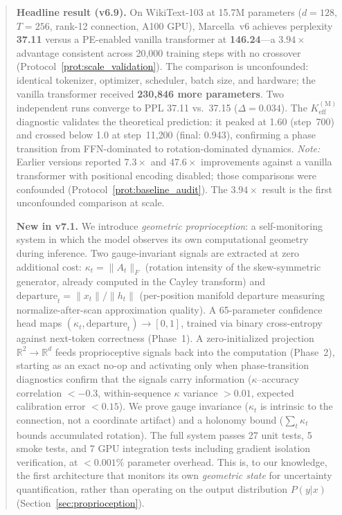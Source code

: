 \documentclass[11pt,a4paper]{article}
\theoremstyle{definition}
\theoremstyle{remark}
\begin{document}
\begin{abstract}
\textbf{Headline result (v6.9).} On WikiText-103 at 15.7M parameters 
($d = 128$, $T = 256$, rank-12 connection, A100 GPU), Marcella~v6 
achieves perplexity \textbf{37.11} versus a PE-enabled vanilla 
transformer at \textbf{146.24}---a $\mathbf{3.94\times}$ advantage 
consistent across 20{,}000 training steps with no crossover 
(Protocol~\ref{prot:scale_validation}). The comparison is unconfounded: 
identical tokenizer, optimizer, scheduler, batch size, and hardware; 
the vanilla transformer received \textbf{230{,}846 more parameters}. 
Two independent runs converge to PPL 37.11 vs.\ 37.15 ($\Delta = 
0.034$). The $K_{\mathrm{eff}}^{(\mathrm{M})}$ diagnostic validates 
the theoretical prediction: it peaked at 1.60 (step~700) and crossed 
below 1.0 at step~11{,}200 (final: 0.943), confirming a phase 
transition from FFN-dominated to rotation-dominated dynamics. 
\emph{Note:} Earlier versions reported $7.3\times$ and $47.6\times$ 
improvements against a vanilla transformer with positional encoding 
disabled; those comparisons were confounded 
(Protocol~\ref{prot:baseline_audit}). The $3.94\times$ result is the 
first unconfounded comparison at scale.

\textbf{New in v7.1.} We introduce \emph{geometric proprioception}: 
a self-monitoring system in which the model observes its own 
computational geometry during inference. Two gauge-invariant signals 
are extracted at zero additional cost: $\kappa_t = \|A_t\|_F$ 
(rotation intensity of the skew-symmetric generator, already computed 
in the Cayley transform) and $\mathrm{departure}_t = \|x_t\|/\|h_t\|$ 
(per-position manifold departure measuring normalize-after-scan 
approximation quality). A 65-parameter confidence head maps 
$(\kappa_t, \mathrm{departure}_t) \to [0,1]$, trained via binary 
cross-entropy against next-token correctness (Phase~1). A 
zero-initialized projection $\mathbb{R}^2 \to \mathbb{R}^d$ 
feeds proprioceptive signals back into the computation 
(Phase~2), starting as an exact no-op and activating only when 
phase-transition diagnostics confirm that the signals carry 
information ($\kappa$--accuracy correlation $< -0.3$, within-sequence 
$\kappa$ variance $> 0.01$, expected calibration error $< 0.15$). 
We prove gauge invariance ($\kappa_t$ is intrinsic to the connection, 
not a coordinate artifact) and a holonomy bound ($\sum_t \kappa_t$ 
bounds accumulated rotation). The full system passes 27 unit tests, 
5 smoke tests, and 7 GPU integration tests including gradient 
isolation verification, at $< 0.001\%$ parameter overhead. This is, 
to our knowledge, the first architecture that monitors its own 
\emph{geometric state} for uncertainty quantification, rather than 
operating on the output distribution $P(y|x)$ 
(Section~\ref{sec:proprioception}).


\end{abstract}
\end{document}
